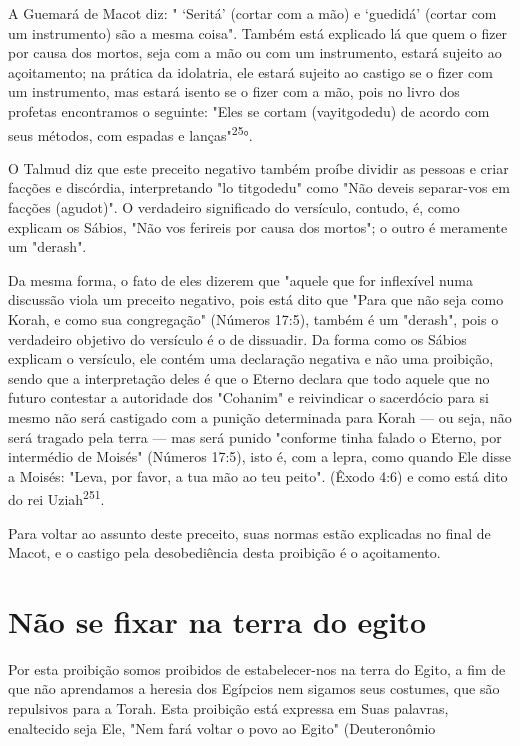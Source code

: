 \begin{itemize}
\begin{enumrate}
\begin{itemize}
\begin{itemize}
\begin{itemize}
A Guemará de Macot diz: " `Seritá' (cortar com a mão) e `guedidá'
(cortar com um instrumento) são a mesma coisa". Também está explicado lá
que quem o fizer por causa dos mortos, seja com a mão ou com um
instrumen­to, estará sujeito ao açoitamento; na prática da idolatria,
ele estará sujeito ao castigo se o fizer com um instrumento, mas estará
isento se o fizer com a mão, pois no livro dos profetas encontramos o
seguinte: "Eles se cortam (vayitgode­du) de acordo com seus métodos, com
espadas e lanças"\textsuperscript{25}°.

O Talmud diz que este preceito negativo também proíbe dividir as pessoas
e criar facções e discórdia, interpretando "lo titgodedu" como "Não
deveis separar-vos em facções (agudot)". O verdadeiro significado do
versícu­lo, contudo, é, como explicam os Sábios, "Não vos ferireis por
causa dos mor­tos"; o outro é meramente um "derash".

Da mesma forma, o fato de eles dizerem que "aquele que for inflexí­vel
numa discussão viola um preceito negativo, pois está dito que "Para que
não seja como Korah, e como sua congregação" (Números 17:5), também é um
"derash", pois o verdadeiro objetivo do versículo é o de dissuadir. Da
forma como os Sábios explicam o versículo, ele contém uma declaração
negativa e não uma proibição, sendo que a interpretação deles é que o
Eterno declara que todo aquele que no futuro contestar a autoridade dos
"Cohanim" e reivindicar o sacerdócio para si mesmo não será castigado
com a punição determinada pa­ra Korah --- ou seja, não será tragado pela
terra --- mas será punido "conforme tinha falado o Eterno, por
intermédio de Moisés" (Números 17:5), isto é, com a lepra, como quando
Ele disse a Moisés: "Leva, por favor, a tua mão ao teu peito". (Êxodo
4:6) e como está dito do rei Uziah\textsuperscript{251}.

Para voltar ao assunto deste preceito, suas normas estão explicadas no
final de Macot, e o castigo pela desobediência desta proibição é o
açoitamento.

\section{Não se fixar na terra do egito}

Por esta proibição somos proibidos de estabelecer-nos na terra do Egito,
a fim de que não aprendamos a heresia dos Egípcios nem sigamos seus
costumes, que são repulsivos para a Torah. Esta proibição está expressa
em Suas palavras, enaltecido seja Ele, "Nem fará voltar o povo ao Egito"
(Deuteronômio



\end{itemize}
\end{itemize}
\end{itemize}
\end{enumrate}
\end{itemize}
